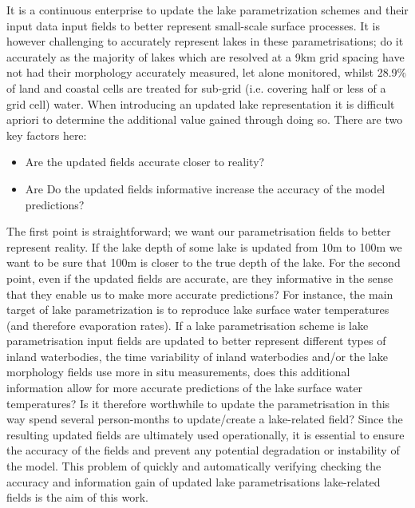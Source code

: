 \documentclass[hess, twostagejnl]{copernicus}
\providecommand{\DIFadd}[1]{{\protect\color{blue} \sf #1}} %
\providecommand{\DIFdel}[1]{{\protect\color{red} \scriptsize #1}} %
\providecommand{\DIFaddbegin}{} %
\providecommand{\DIFaddend}{} %
\providecommand{\DIFdelbegin}{} %
\providecommand{\DIFdelend}{} %
\begin{document}
\noindent It is a continuous enterprise to update the lake parametrization \DIFdelbegin \DIFdel{schemes and their input data }\DIFdelend \DIFaddbegin \DIFadd{input }\DIFaddend fields to better represent small-scale surface processes. It is however challenging to \DIFdelbegin \DIFdel{accurately represent lakes in these parametrisations; }\DIFdelend \DIFaddbegin \DIFadd{do it accurately as }\DIFaddend the majority of lakes which are resolved at a 9km grid spacing have not had their morphology accurately measured, let alone monitored, whilst 28.9$\%$ of land and coastal cells are treated for sub-grid \DIFaddbegin \DIFadd{(i.e. covering half or less of a grid cell) }\DIFaddend water. When introducing an updated lake representation it is difficult apriori to determine the additional value gained through doing so. There are two key factors here:
\begin{itemize}
	\item Are the updated fields \DIFdelbegin \DIFdel{accurate}\DIFdelend \DIFaddbegin \DIFadd{closer to reality}\DIFaddend ?
	\item \DIFdelbegin \DIFdel{Are }\DIFdelend \DIFaddbegin \DIFadd{Do }\DIFaddend the updated fields \DIFdelbegin \DIFdel{informative}\DIFdelend \DIFaddbegin \DIFadd{increase the accuracy of the model predictions}\DIFaddend ?
\end{itemize}
The first point is straightforward; we want our \DIFdelbegin \DIFdel{parametrisation }\DIFdelend fields to better represent reality. If the lake depth of some lake is updated from 10m to 100m we want to be sure that 100m is closer to the true depth of the lake. For the second point, even if the updated fields are accurate, are they informative in the sense that they enable us to make more accurate predictions? For instance, the main target of lake parametrization is to reproduce lake surface water temperatures (and therefore evaporation rates). If \DIFdelbegin \DIFdel{a lake parametrisation scheme is }\DIFdelend \DIFaddbegin \DIFadd{lake parametrisation input fields are }\DIFaddend updated to better represent different types of inland waterbodies, the time variability of inland waterbodies and/or the lake morphology fields use more in situ measurements, does this additional information allow for more accurate predictions of the lake surface water temperatures? Is it therefore worthwhile to \DIFdelbegin \DIFdel{update the parametrisation in this way}\DIFdelend \DIFaddbegin \DIFadd{spend several person-months to update/create a lake-related field}\DIFaddend ? Since the resulting updated fields are ultimately used operationally, it is essential to ensure the accuracy of the fields and prevent any potential degradation or instability of the model. This problem of quickly and automatically \DIFdelbegin \DIFdel{verifying }\DIFdelend \DIFaddbegin \DIFadd{checking }\DIFaddend the accuracy and information gain of updated \DIFdelbegin \DIFdel{lake parametrisations }\DIFdelend \DIFaddbegin \DIFadd{lake-related fields }\DIFaddend is the aim of this work. \newline
\end{document}
